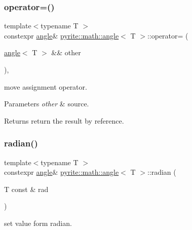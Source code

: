 \subsubsection{\texorpdfstring{operator=()}{operator=()}\hspace{0.1cm}{\footnotesize\ttfamily [2/2]}}
{\footnotesize\ttfamily template$<$typename T $>$ \\
constexpr \mbox{\hyperlink{classpyrite_1_1math_1_1angle}{angle}}\& \mbox{\hyperlink{classpyrite_1_1math_1_1angle}{pyrite\+::math\+::angle}}$<$ T $>$\+::operator= (\begin{DoxyParamCaption}\item[{\mbox{\hyperlink{classpyrite_1_1math_1_1angle}{angle}}$<$ T $>$ \&\&}]{other }\end{DoxyParamCaption})\hspace{0.3cm}{\ttfamily [inline]}, {\ttfamily [noexcept]}}

move assignment operator.


\begin{DoxyParams}{Parameters}
{\em other} & source. \\
\hline
\end{DoxyParams}
\begin{DoxyReturn}{Returns}
return the result by reference. 
\end{DoxyReturn}
\mbox{\label{classpyrite_1_1math_1_1angle_a2fab8f4261d509f5272e9f9ebec19028}} 
\subsubsection{\texorpdfstring{radian()}{radian()}\hspace{0.1cm}{\footnotesize\ttfamily [1/2]}}
{\footnotesize\ttfamily template$<$typename T $>$ \\
constexpr \mbox{\hyperlink{classpyrite_1_1math_1_1angle}{angle}}\& \mbox{\hyperlink{classpyrite_1_1math_1_1angle}{pyrite\+::math\+::angle}}$<$ T $>$\+::radian (\begin{DoxyParamCaption}\item[{T const \&}]{rad }\end{DoxyParamCaption})\hspace{0.3cm}{\ttfamily [inline]}}

set value form radian.



